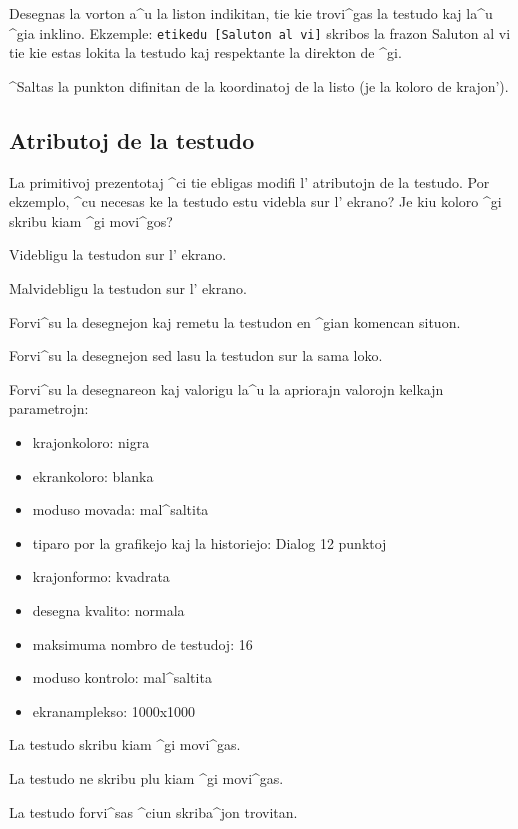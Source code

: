 Desegnas la vorton a^u la liston indikitan, tie kie trovi^gas 
la testudo kaj la^u ^gia inklino.
Ekzemple: \texttt{etikedu [Saluton al vi]} skribos la frazon 
\og Saluton al vi\fg{} tie kie estas lokita la testudo
kaj respektante la direkton de ^gi.

^Saltas la punkton difinitan de la koordinatoj de la listo (je la 
koloro de krajon').

\subsection{Atributoj de la testudo}

La primitivoj prezentotaj ^ci tie ebligas modifi l' atributojn de la
testudo.  Por ekzemplo, ^cu necesas ke la testudo estu videbla sur l'
ekrano?  Je kiu koloro ^gi skribu kiam ^gi movi^gos?

Videbligu la testudon sur l' ekrano.

Malvidebligu la testudon sur l' ekrano.

Forvi^su la desegnejon kaj remetu la testudon en ^gian komencan situon.

Forvi^su la desegnejon sed lasu la testudon sur la sama loko.

Forvi^su la desegnareon kaj valorigu la^u la apriorajn valorojn kelkajn 
parametrojn:
\begin{itemize}
 \item krajonkoloro: nigra
 \item ekrankoloro: blanka
 \item moduso movada: mal^saltita
 \item tiparo por la grafikejo kaj la historiejo: Dialog 12 punktoj
 \item krajonformo: kvadrata
 \item desegna kvalito: normala
 \item maksimuma nombro de testudoj: 16
 \item moduso kontrolo: mal^saltita
 \item ekranamplekso: 1000x1000
\end{itemize}

La testudo skribu kiam ^gi movi^gas.

La testudo ne skribu plu kiam ^gi movi^gas.

La testudo forvi^sas ^ciun skriba^jon trovitan.

